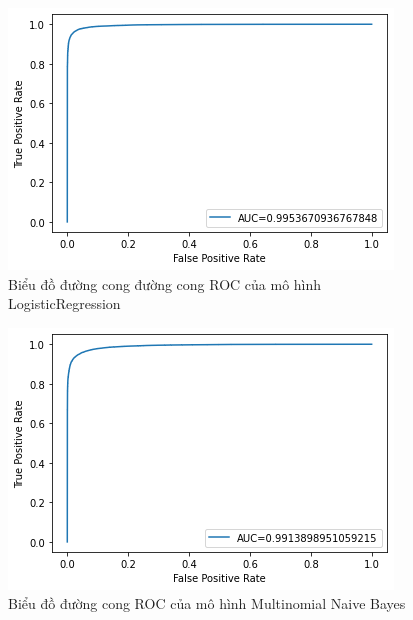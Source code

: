 \documentclass[../DoAn.tex]{subfiles}
\begin{document}
\begin{figure}
\centering
\includegraphics[width=1\linewidth]{Hinh_ve/LogisticRegression.png}
\caption{Biểu đồ đường cong đường cong ROC của mô hình LogisticRegression}
\label{fig:LRgression}
\end{figure}

\begin{figure}
\centering
\includegraphics[width=1\linewidth]{Hinh_ve/MultinomialNB.png}
\caption{Biểu đồ đường cong ROC của mô hình Multinomial Naive Bayes}
\label{fig:MTilNB}
\end{figure}
\end{document}
